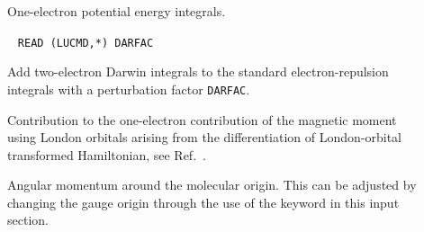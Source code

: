\begin{description}
\item[] One-electron potential energy integrals.


\item[]\verb| |\newline
\verb|READ (LUCMD,*) DARFAC|


Add two-electron Darwin integrals to the standard electron-repulsion
integrals with a perturbation factor \verb|DARFAC|.

\item[] Contribution to the one-electron contribution of
the magnetic moment using London orbitals
 arising from the differentiation of London-orbital transformed Hamiltonian, see Ref.~\cite{thpjjcp95}.


\item[] Angular momentum around the molecular origin.
This can be adjusted by changing the gauge origin through the use of
the  keyword in this input section.



\end{description}
